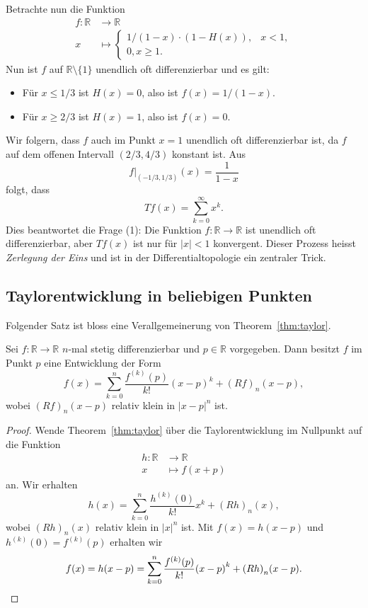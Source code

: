 \documentclass[../main.tex]{subfiles}
\begin{document}
\begin{examples}
\begin{enumerate}[(1)]
      Betrachte nun die Funktion
      \begin{align*}
        f \colon \mathbb{R} & \to \mathbb{R} \\
        x & \mapsto 
        \begin{cases}
          1/(1- x) \cdot (1 - H(x)), & x < 1,\\
          0, x \geq 1.
        \end{cases}
      \end{align*}
      Nun ist $f$ auf $\mathbb{R} \setminus \{1\}$
      unendlich oft differenzierbar und es gilt:
      \begin{itemize}
        \item Für $x \leq 1/3$ ist $H(x) = 0$, also
          ist $f(x) = 1/(1- x)$.
        \item Für $x \geq 2/3$ ist $H(x) = 1$, also
          ist $f(x) = 0$.
      \end{itemize}
      Wir folgern, dass $f$ auch im Punkt $x = 1$ 
      unendlich oft differenzierbar ist,
      da $f$ auf dem offenen Intervall $(2/3, 4/3)$ konstant ist.
      Aus
      \[
        f|_{(-1/3, 1/3)}(x) = \frac{1}{1-x}
      \]
      folgt, dass
      \[
        Tf(x) = \sum_{k=0}^{\infty} x^k.
      \]
      Dies beantwortet die Frage (1): Die Funktion $f \colon \mathbb{R} \to \mathbb{R}$ 
      ist unendlich oft differenzierbar, aber $Tf(x)$ ist nur für $|x| < 1$ konvergent.
      Dieser Prozess heisst \emph{Zerlegung der Eins} und ist in der Differentialtopologie
      ein zentraler Trick.
  \end{enumerate}
\end{examples}

\subsection*{Taylorentwicklung in beliebigen Punkten}
Folgender Satz ist bloss eine Verallgemeinerung von Theorem~\ref{thm:taylor}.

\begin{theorem}
  Sei $f \colon \mathbb{R} \to \mathbb{R}$ $n$-mal stetig differenzierbar
  und $p \in \mathbb{R}$ vorgegeben.
  Dann besitzt $f$ im Punkt $p$ eine Entwicklung der Form
  \[
    f(x) = \sum_{k=0}^{n} \frac{f^{(k)}(p)}{k!} {(x - p)}^k + {(Rf)}_n(x - p),
  \]
  wobei ${(Rf)}_n (x - p)$ relativ klein in $|x - p|^n$ ist.
\end{theorem}

\begin{proof}
  Wende Theorem~\ref{thm:taylor} über die Taylorentwicklung im Nullpunkt
  auf die Funktion
  \begin{align*}
    h \colon \mathbb{R} & \to \mathbb{R} \\
    x & \mapsto f(x + p)
  \end{align*}
  an. Wir erhalten
  \[
    h(x) = \sum_{k=0}^{n} \frac{h^{(k)}(0)}{k!} x^k + {(Rh)}_n(x),
  \]
  wobei ${(Rh)}_n(x)$ relativ klein in $|x|^n$ ist.
  Mit $f(x) = h(x - p)$ und $h^{(k)}(0) = f^{(k)}(p)$ erhalten wir
  \[
    f(x) = h(x - p) = \sum_{k=0}^{n} \frac{f^{(k)}(p)}{k!}{(x-p)}^k + {(Rh)}_n(x-p).
    \qedhere
  \]
\end{proof}
\end{document}
